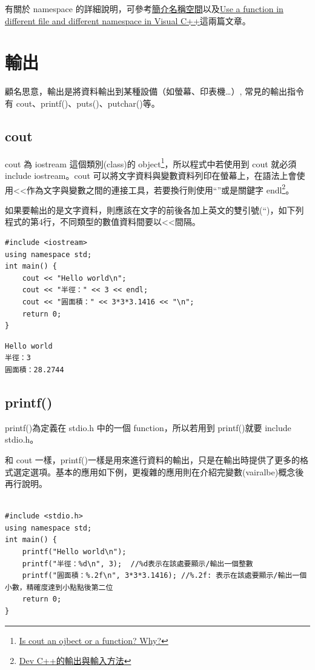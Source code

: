 \documentclass[12pt,a4paper]{article}
\begin{document}
有關於 namespace 的詳細說明，可參考\href{https://openhome.cc/Gossip/CppGossip/Namespace.html}{簡介名稱空間}以及\href{https://stackoverflow.com/questions/37693999/use-a-function-in-different-file-and-different-namespace-in-visual-c}{Use a function in different file and different namespace in Visual C++}這兩篇文章。

\section{輸出}
\label{cpp_output}
顧名思意，輸出是將資料輸出到某種設備（如螢幕、印表機\ldots{}）, 常見的輸出指令有 cout、printf()、puts()、putchar()等。
\subsection{cout}
\label{sec:org6234130}
cout 為 iostream 這個類別(class)的 object\footnote{\href{https://www.quora.com/Is-cout-an-object-or-a-function-Why}{Is cout an ojbect or a function? Why?}}，所以程式中若使用到 cout 就必須 include iostream。cout 可以將文字資料與變數資料列印在螢幕上，在語法上會使用<<作為文字與變數之間的連接工具，若要換行則使用``\n''或是關鍵字 endl\footnote{\href{http://rs2.ocu.edu.tw/\~jengchi/IO\_instruction.htm}{Dev C++的輸出與輸入方法}}。

如果要輸出的是文字資料，則應該在文字的前後各加上英文的雙引號(``)，如下列程式的第4行，不同類型的數值資料間要以<<間隔。

\lstset{breaklines=true,language=cpp,label= ,caption= ,captionpos=b,firstnumber=1,numbers=left}
\begin{lstlisting}
#include <iostream>
using namespace std;
int main() {
    cout << "Hello world\n";
    cout << "半徑：" << 3 << endl;
    cout << "圓面積：" << 3*3*3.1416 << "\n";
    return 0;
}
\end{lstlisting}

\begin{verbatim}
Hello world
半徑：3
圓面積：28.2744
\end{verbatim}

\subsection{printf()}
\label{cpp_printf}
printf()為定義在 stdio.h 中的一個 function，所以若用到 printf()就要 include stdio.h。

和 cout 一樣，printf()一樣是用來進行資料的輸出，只是在輸出時提供了更多的格式選定選項。基本的應用如下例，更複雜的應用則在介紹完變數(vairalbe)概念後再行說明。
\lstset{breaklines=true,language=cpp,label= ,caption= ,captionpos=b,firstnumber=1,numbers=left}
\begin{lstlisting}

#include <stdio.h>
using namespace std;
int main() {
    printf("Hello world\n");
    printf("半徑：%d\n", 3);  //%d表示在該處要顯示/輸出一個整數
    printf("圓面積：%.2f\n", 3*3*3.1416); //%.2f: 表示在該處要顯示/輸出一個小數，精確度達到小點點後第二位
    return 0;
}
\end{lstlisting}
\end{document}
